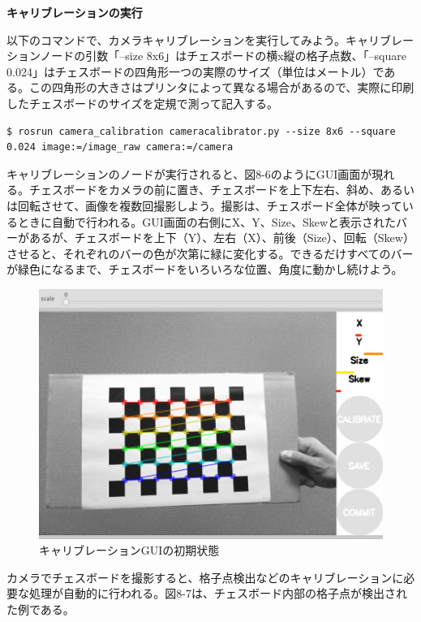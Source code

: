 \textbf{キャリブレーションの実行}

以下のコマンドで、カメラキャリブレーションを実行してみよう。キャリブレーションノードの引数「--size 8x6」はチェスボードの横x縦の格子点数、「--square 0.024」はチェスボードの四角形一つの実際のサイズ（単位はメートル）である。この四角形の大きさはプリンタによって異なる場合があるので、実際に印刷したチェスボードのサイズを定規で測って記入する。

\begin{lstlisting}[language=ROS]
$ rosrun camera_calibration cameracalibrator.py --size 8x6 --square 0.024 image:=/image_raw camera:=/camera
\end{lstlisting}

キャリブレーションのノードが実行されると、図8-6のようにGUI画面が現れる。チェスボードをカメラの前に置き、チェスボードを上下左右、斜め、あるいは回転させて、画像を複数回撮影しよう。撮影は、チェスボード全体が映っているときに自動で行われる。GUI画面の右側にX、Y、Size、Skewと表示されたバーがあるが、チェスボードを上下（Y）、左右（X）、前後（Size）、回転（Skew）させると、それぞれのバーの色が次第に緑に変化する。できるだけすべてのバーが緑色になるまで、チェスボードをいろいろな位置、角度に動かし続けよう。

\begin{figure}[ht]
  \centering
  \includegraphics[width=\columnwidth]{pictures/chapter8/pic_08_06.png}
  \caption{キャリブレーションGUIの初期状態}
\end{figure}

カメラでチェスボードを撮影すると、格子点検出などのキャリブレーションに必要な処理が自動的に行われる。図8-7は、チェスボード内部の格子点が検出された例である。

